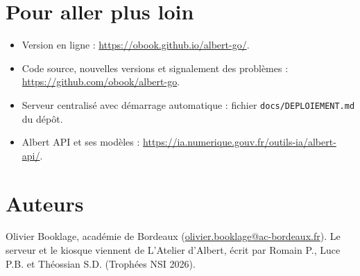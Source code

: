 \documentclass[a4paper, 11pt]{article}
\begin{document}
\section{Pour aller plus loin}
\label{sec:plus-loin}

\begin{itemize}
  \item Version en ligne : \url{https://obook.github.io/albert-go/}.
  \item Code source, nouvelles versions et signalement des problèmes : \url{https://github.com/obook/albert-go}.
  \item Serveur centralisé avec démarrage automatique : fichier \texttt{docs/DEPLOIEMENT.md} du dépôt.
  \item Albert API et ses modèles : \url{https://ia.numerique.gouv.fr/outils-ia/albert-api/}.
\end{itemize}

\section{Auteurs}
\label{sec:auteurs}

Olivier Booklage, académie de Bordeaux (\href{mailto:olivier.booklage@ac-bordeaux.fr}{olivier.booklage@ac-bordeaux.fr}). Le serveur et le kiosque viennent de L'Atelier d'Albert, écrit par Romain P., Luce P.B. et Théossian S.D. (Trophées NSI 2026).
\end{document}
